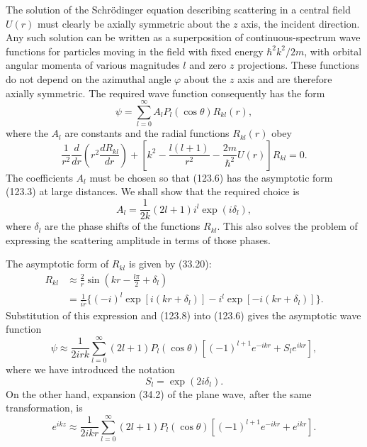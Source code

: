 The solution of the Schrödinger equation describing scattering in a central field $U(r)$ must clearly be axially symmetric about the $z$ axis, the incident direction. Any such solution can be written as a superposition of continuous-spectrum wave functions for particles moving in the field with fixed energy $\hbar^2k^2/2m$, with orbital angular momenta of various magnitudes $l$ and zero $z$ projections. These functions do not depend on the azimuthal angle $\varphi$ about the $z$ axis and are therefore axially symmetric. The required wave function consequently has the form
\begin{equation}
 \psi=\sum_{l=0}^\infty A_lP_l(\cos\theta)R_{kl}(r),
 \tag{123.6}
\end{equation}
where the $A_l$ are constants and the radial functions $R_{kl}(r)$ obey
\begin{equation}
 \frac1{r^2}\frac d{dr}\left(r^2\frac{dR_{kl}}{dr}\right)
 +\left[k^2-\frac{l(l+1)}{r^2}-\frac{2m}{\hbar^2}U(r)\right]R_{kl}=0.
 \tag{123.7}
\end{equation}
The coefficients $A_l$ must be chosen so that (123.6) has the asymptotic form (123.3) at large distances. We shall show that the required choice is
\begin{equation}
 A_l=\frac1{2k}(2l+1)i^l\exp(i\delta_l),
 \tag{123.8}
\end{equation}
where $\delta_l$ are the phase shifts of the functions $R_{kl}$. This also solves the problem of expressing the scattering amplitude in terms of those phases.

The asymptotic form of $R_{kl}$ is given by (33.20):
\[
 \begin{split}
 R_{kl}&\approx\frac2r\sin\left(kr-\frac{l\pi}{2}+\delta_l\right)\\
 &=\frac1{ir}\{(-i)^l\exp[i(kr+\delta_l)]
 -i^l\exp[-i(kr+\delta_l)]\}.
 \end{split}
\]
Substitution of this expression and (123.8) into (123.6) gives the asymptotic wave function
\begin{equation}
 \psi\approx\frac1{2irk}\sum_{l=0}^\infty(2l+1)P_l(\cos\theta)
 [(-1)^{l+1}e^{-ikr}+S_le^{ikr}],
 \tag{123.9}
\end{equation}
where we have introduced the notation
\begin{equation}
 S_l=\exp(2i\delta_l).
 \tag{123.10}
\end{equation}
On the other hand, expansion (34.2) of the plane wave, after the same transformation, is
\[
 e^{ikz}\approx\frac1{2ikr}\sum_{l=0}^\infty(2l+1)P_l(\cos\theta)
 [(-1)^{l+1}e^{-ikr}+e^{ikr}].
\]

